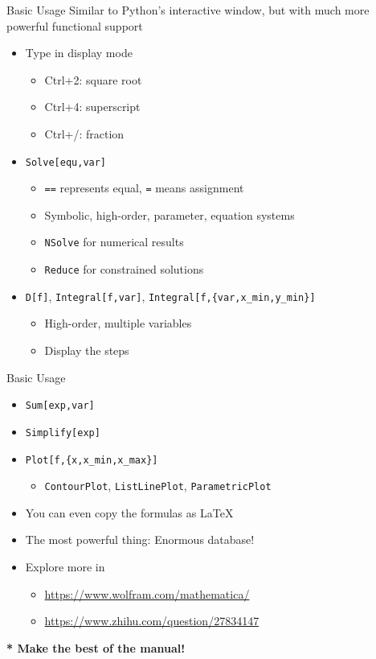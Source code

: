 \documentclass{../TexTemplate/myslide}
\begin{document}
\begin{frame}[fragile]{Basic Usage}
Similar to Python's interactive window, but with much more powerful functional support
\begin{itemize}
	\item Type in display mode
	\begin{itemize}
		\item Ctrl+2: square root
		\item Ctrl+4: superscript
		\item Ctrl+/: fraction
	\end{itemize}
	\item \verb'Solve[equ,var]'
	\begin{itemize}
		\item \verb'==' represents equal, \verb'=' means assignment
		\item Symbolic, high-order, parameter, equation systems
		\item \verb'NSolve' for numerical results
		\item \verb'Reduce' for constrained solutions
	\end{itemize}
	\item \verb'D[f]', \verb'Integral[f,var]', \verb'Integral[f,{var,x_min,y_min}]'
	\begin{itemize}
		\item High-order, multiple variables
		\item Display the steps
	\end{itemize}
\end{itemize}
\end{frame}

\begin{frame}[fragile]{Basic Usage}
\begin{itemize}
	\item \verb'Sum[exp,var]'
	\item \verb'Simplify[exp]'
	\item \verb'Plot[f,{x,x_min,x_max}]'
	\begin{itemize}
		\item \verb'ContourPlot', \verb'ListLinePlot', \verb'ParametricPlot'
	\end{itemize}
	\item You can even copy the formulas as \LaTeX
	\item The most powerful thing: Enormous database!
	\item Explore more in
	\begin{itemize}
		\item \url{https://www.wolfram.com/mathematica/}
		\item \url{https://www.zhihu.com/question/27834147}
	\end{itemize}
\end{itemize}
\textbf{* Make the best of the manual!}
\end{frame}
\end{document}
